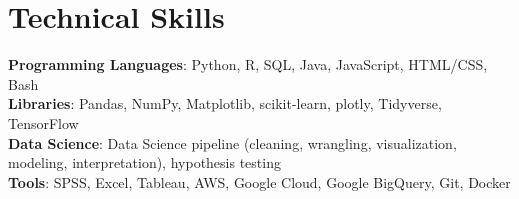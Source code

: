 \section{Technical Skills}
 \begin{itemize}[leftmargin=0.15in, label={}]
    \small{\item{
     \textbf{Programming Languages}{: Python, R, SQL, Java, JavaScript, HTML/CSS, Bash} \\
     \textbf{Libraries}{: Pandas, NumPy, Matplotlib, scikit-learn, plotly, Tidyverse, TensorFlow}\\
     \textbf{Data Science}{: Data Science pipeline (cleaning, wrangling, visualization, modeling, interpretation), hypothesis testing}\\
     \textbf{Tools}{: SPSS, Excel, Tableau, AWS, Google Cloud, Google BigQuery, Git, Docker}\\
    }}
 \end{itemize}